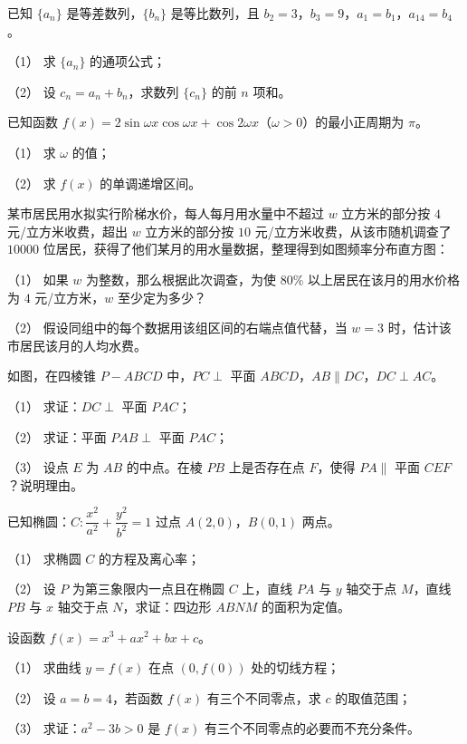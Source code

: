 \begin{question}
已知 \(\{a_{n}\}\) 是等差数列，\(\{b_{n}\}\) 是等比数列，且 \(b_{2}=3\)，\(b_{3}=9\)，\(a_{1}=b_{1}\)，\(a_{14}=b_{4}\)。

（1） 求 \(\{a_{n}\}\) 的通项公式；

（2） 设 \(c_{n}=a_{n}+b_{n}\)，求数列 \(\{c_{n}\}\) 的前 \(n\) 项和。

\end{question}
\begin{question}
已知函数 \(f(x)=2\sin\omega x\cos\omega x+\cos 2\omega x\)（\(\omega>0\)）的最小正周期为 \(\pi\)。

（1） 求 \(\omega\) 的值；

（2） 求 \(f(x)\) 的单调递增区间。

\Needspace{0.4\textheight}
\end{question}
\begin{question}
某市居民用水拟实行阶梯水价，每人每月用水量中不超过 \(w\) 立方米的部分按 \(4\) 元/立方米收费，超出 \(w\) 立方米的部分按 \(10\) 元/立方米收费，从该市随机调查了 \(10000\) 位居民，获得了他们某月的用水量数据，整理得到如图频率分布直方图：
\nopagebreak[4]
\begin{center}\end{center}
\nopagebreak[4]
（1） 如果 \(w\) 为整数，那么根据此次调查，为使 80\% 以上居民在该月的用水价格为 \(4\) 元/立方米，\(w\) 至少定为多少？

（2） 假设同组中的每个数据用该组区间的右端点值代替，当 \(w=3\) 时，估计该市居民该月的人均水费。

\Needspace{0.4\textheight}
\end{question}
\begin{question}
如图，在四棱锥 \(P-ABCD\) 中，\(PC\perp\) 平面 \(ABCD\)，\(AB\parallel DC\)，\(DC\perp AC\)。
\nopagebreak[4]
\begin{center}\end{center}
\nopagebreak[4]
（1） 求证：\(DC\perp\) 平面 \(PAC\)；

（2） 求证：平面 \(PAB\perp\) 平面 \(PAC\)；

（3） 设点 \(E\) 为 \(AB\) 的中点。在棱 \(PB\) 上是否存在点 \(F\)，使得 \(PA\parallel\) 平面 \(CEF\)？说明理由。

\end{question}
\begin{question}
已知椭圆：\(C:\dfrac{x^{2}}{a^{2}}+\dfrac{y^{2}}{b^{2}}=1\) 过点 \(A(2,0)\)，\(B(0,1)\) 两点。

（1） 求椭圆 \(C\) 的方程及离心率；

（2） 设 \(P\) 为第三象限内一点且在椭圆 \(C\) 上，直线 \(PA\) 与 \(y\) 轴交于点 \(M\)，直线 \(PB\) 与 \(x\) 轴交于点 \(N\)，求证：四边形 \(ABNM\) 的面积为定值。

\end{question}
\begin{question}
设函数 \(f(x)=x^{3}+ax^{2}+bx+c\)。

（1） 求曲线 \(y=f(x)\) 在点 \((0,f(0))\) 处的切线方程；

（2） 设 \(a=b=4\)，若函数 \(f(x)\) 有三个不同零点，求 \(c\) 的取值范围；

（3） 求证：\(a^{2}-3b>0\) 是 \(f(x)\) 有三个不同零点的必要而不充分条件。

\end{question}